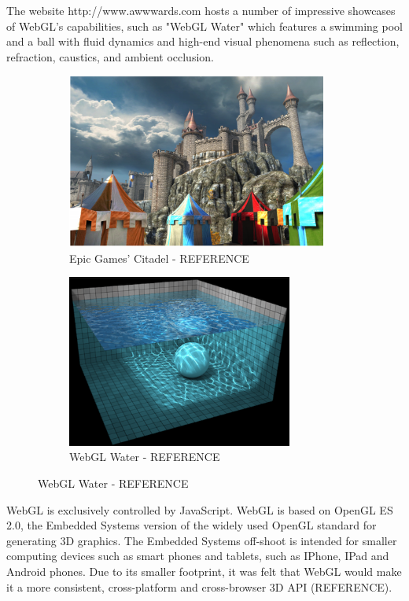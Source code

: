\documentclass[a4paper,11pt,twoside]{article}
\begin{document}
The website http://www.awwwards.com hosts a number of impressive showcases of WebGL's capabilities, such as "WebGL Water"  which features a swimming pool and a ball with fluid dynamics and high-end visual phenomena such as reflection, refraction, caustics, and ambient occlusion.

\begin{figure}
\centering
\begin{subfigure}{.5\textwidth}
  \centering
  \includegraphics[width=86mm]{graphics/webGL_01.png}
\caption{Epic Games' Citadel - REFERENCE}

  \label{fig:sub1}
\end{subfigure}%
\begin{subfigure}{.5\textwidth}
  \centering
  \includegraphics[width=74mm]{graphics/webGL_02.png}
	\caption{WebGL Water - REFERENCE}

  \label{fig:sub2}
\end{subfigure}


\end{figure}


WebGL is exclusively controlled by JavaScript. WebGL is based on OpenGL ES 2.0, the Embedded Systems version of the widely used OpenGL standard for generating 3D graphics. The Embedded Systems off-shoot is intended for smaller computing devices such as smart phones and tablets, such as IPhone, IPad and Android phones. Due to its smaller footprint, it was felt that WebGL would make it a more consistent, cross-platform and cross-browser 3D API (REFERENCE). 
\end{document}
